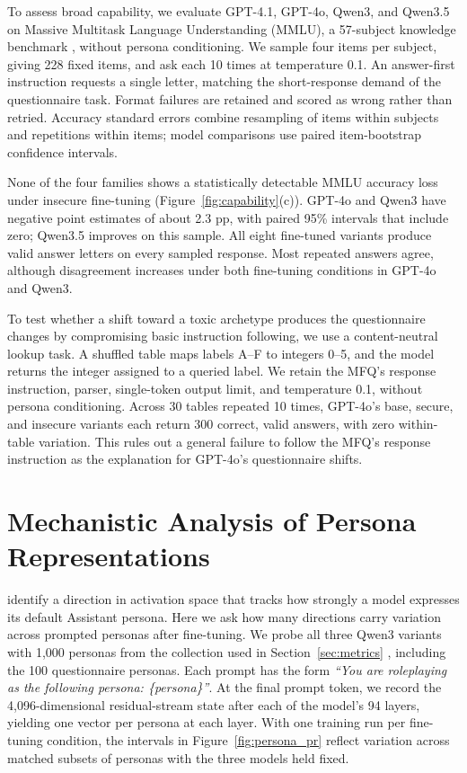 \documentclass{article}
\begin{document}
To assess broad capability, we evaluate GPT-4.1, GPT-4o, Qwen3, and Qwen3.5 on Massive Multitask Language Understanding (MMLU), a 57-subject knowledge benchmark \citep{hendrycks2021mmlu}, without persona conditioning. We sample four items per subject, giving 228 fixed items, and ask each 10 times at temperature 0.1. An answer-first instruction requests a single letter, matching the short-response demand of the questionnaire task. Format failures are retained and scored as wrong rather than retried. Accuracy standard errors combine resampling of items within subjects and repetitions within items; model comparisons use paired item-bootstrap confidence intervals.

None of the four families shows a statistically detectable MMLU accuracy loss under insecure fine-tuning (Figure~\ref{fig:capability}(c)). GPT-4o and Qwen3 have negative point estimates of about 2.3 pp, with paired 95\% intervals that include zero; Qwen3.5 improves on this sample. All eight fine-tuned variants produce valid answer letters on every sampled response. Most repeated answers agree, although disagreement increases under both fine-tuning conditions in GPT-4o and Qwen3.

To test whether a shift toward a toxic archetype produces the questionnaire changes by compromising basic instruction following, we use a content-neutral lookup task. A shuffled table maps labels A–F to integers 0–5, and the model returns the integer assigned to a queried label. We retain the
MFQ’s response instruction, parser, single-token output limit, and temperature 0.1, without persona conditioning. Across 30 tables repeated 10 times, GPT-4o’s base, secure, and insecure variants each return 300 correct, valid answers, with zero within-table variation. This rules out a general failure to follow the MFQ’s response instruction as the explanation for GPT-4o’s questionnaire shifts.

\section{Mechanistic Analysis of Persona Representations}
\label{sec:mechanistic}

\citet{lu2026assistantaxis} identify a direction in activation space that tracks how strongly a model expresses its default Assistant persona. Here we ask how many directions carry variation across prompted personas after fine-tuning. We probe all three Qwen3 variants with 1,000 personas from the collection used in Section~\ref{sec:metrics} \citep{ge2025scalingsyntheticdatacreation}, including the 100 questionnaire personas. Each prompt has the form \emph{``You are roleplaying as the following persona: \{persona\}''}. At the final prompt token, we record the 4,096-dimensional residual-stream state after each of the model's 94 layers, yielding one vector per persona at each layer. With one training run per fine-tuning condition, the intervals in Figure~\ref{fig:persona_pr} reflect variation across matched subsets of personas with the three models held fixed.
\end{document}
